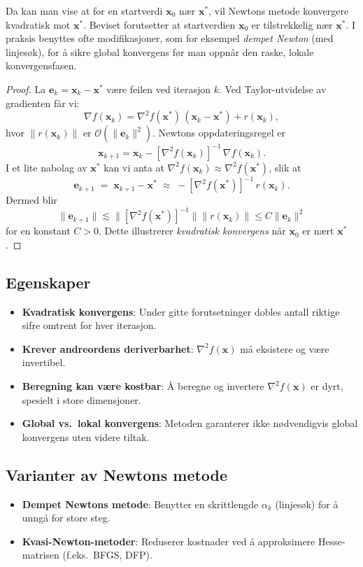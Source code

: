 Da kan man vise at for en startverdi \(\symbf{x}_0\) nær \(\symbf{x}^\ast\), vil Newtons metode konvergere kvadratisk mot \(\symbf{x}^\ast\).
Beviset forutsetter at startverdien \(\symbf{x}_0\) er tilstrekkelig nær \(\symbf{x}^\ast\). I praksis benyttes ofte modifikasjoner, som for eksempel \textit{dempet Newton} (med linjesøk), for å sikre global konvergens før man oppnår den raske, lokale konvergensfasen.
\begin{proof}{}{}
	La \(\symbf{e}_k = \symbf{x}_k - \symbf{x}^\ast\) være feilen ved iterasjon \(k\).
	Ved Taylor-utvidelse av gradienten får vi:
	\[
		\nabla f(\symbf{x}_k)
		= \nabla^2 f(\symbf{x}^\ast)\,(\symbf{x}_k - \symbf{x}^\ast) + r(\symbf{x}_k),
	\]
	hvor \(\|r(\symbf{x}_k)\|\) er \(\mathcal{O}(\|\symbf{e}_k\|^2)\). Newtons oppdateringsregel er
	\[
		\symbf{x}_{k+1}
		= \symbf{x}_k
		- [\nabla^2 f(\symbf{x}_k)]^{-1}\,\nabla f(\symbf{x}_k).
	\]
	I et lite nabolag av \(\symbf{x}^\ast\) kan vi anta at
	\(\nabla^2 f(\symbf{x}_k)\approx \nabla^2 f(\symbf{x}^\ast)\), slik at
	\[
		\symbf{e}_{k+1}
		\;=\; \symbf{x}_{k+1} - \symbf{x}^\ast
		\;\approx\;
		-[\nabla^2 f(\symbf{x}^\ast)]^{-1}\,r(\symbf{x}_k).
	\]
	Dermed blir
	\[
		\|\symbf{e}_{k+1}\| \lesssim \|[\nabla^2 f(\symbf{x}^\ast)]^{-1}\| \|r(\symbf{x}_k)\| \le C \|\symbf{e}_k\|^2
	\]
	for en konstant \(C>0\). Dette illustrerer \textit{kvadratisk konvergens} når \(\symbf{x}_0\) er nært \(\symbf{x}^\ast\).
\end{proof}

\subsection{Egenskaper}
\begin{itemize}
	\item \textbf{Kvadratisk konvergens}: Under gitte forutsetninger dobles antall riktige sifre omtrent for hver iterasjon.
	\item \textbf{Krever andreordens deriverbarhet}: \(\nabla^2 f(\symbf{x})\) må eksistere og være invertibel.
	\item \textbf{Beregning kan være kostbar}: Å beregne og invertere \(\nabla^2 f(\symbf{x})\) er dyrt, spesielt i store dimensjoner.
	\item \textbf{Global vs.\ lokal konvergens}: Metoden garanterer ikke nødvendigvis global konvergens uten videre tiltak.
\end{itemize}

\subsection{Varianter av Newtons metode}
\begin{itemize}
	\item \textbf{Dempet Newtons metode}: Benytter en skrittlengde \(\alpha_k\) (linjesøk) for å unngå for store steg.
	\item \textbf{Kvasi-Newton-metoder}: Reduserer kostnader ved å approksimere Hesse-matrisen (f.eks.\ BFGS, DFP).
\end{itemize}

